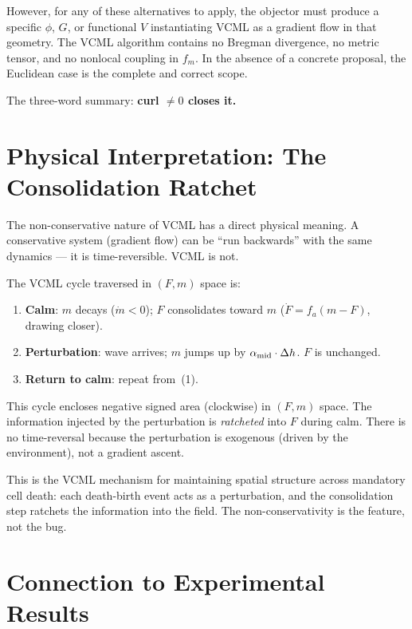 \documentclass[11pt,a4paper]{article}
\begin{document}
However, for any of these alternatives to apply, the objector must produce
a specific $\phi$, $G$, or functional $V$ instantiating VCML as a
gradient flow in that geometry.
The VCML algorithm contains no Bregman divergence, no metric tensor,
and no nonlocal coupling in $f_m$.
In the absence of a concrete proposal, the Euclidean case is the
complete and correct scope.

The three-word summary: \textbf{curl $\neq 0$ closes it.}

\section{Physical Interpretation: The Consolidation Ratchet}
\label{sec:physical}

The non-conservative nature of VCML has a direct physical meaning.
A conservative system (gradient flow) can be ``run backwards'' with
the same dynamics — it is time-reversible.
VCML is not.

The VCML cycle traversed in $(F,m)$ space is:
\begin{enumerate}[noitemsep]
  \item \textbf{Calm}: $m$ decays ($\dot{m}<0$); $F$ consolidates toward $m$
    ($\dot{F} = f_a(m-F)$, drawing closer).
  \item \textbf{Perturbation}: wave arrives; $m$ jumps up by
    $\alpha_{\rm mid}\cdot\Delta h$.
    $F$ is unchanged.
  \item \textbf{Return to calm}: repeat from~(1).
\end{enumerate}
This cycle encloses negative signed area (clockwise) in $(F,m)$ space.
The information injected by the perturbation is \emph{ratcheted} into
$F$ during calm.
There is no time-reversal because the perturbation is exogenous
(driven by the environment), not a gradient ascent.

This is the VCML mechanism for maintaining spatial structure across
mandatory cell death: each death-birth event acts as a perturbation,
and the consolidation step ratchets the information into the field.
The non-conservativity is the feature, not the bug.

\section{Connection to Experimental Results}
\label{sec:context}
\end{document}
